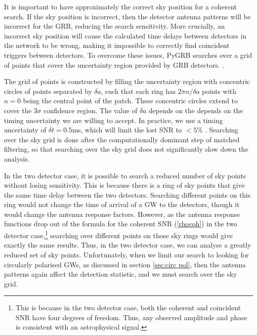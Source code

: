 \documentclass[11pt]{cuthesis}
\begin{document}
It is important to have approximately the correct sky position for a coherent search. If the sky position is incorrect, then the detector antenna patterns will be incorrect for the GRB, reducing the search sensitivity. More crucially, an incorrect sky position will cause the calculated time delays between detectors in the network to be wrong, making it impossible to correctly find coincident triggers between detectors. To overcome these issues, PyGRB searches over a grid of points that cover the uncertainty region provided by GRB detectors. \cite{pygrb_Williamson:2014,was_sky_grid}.

The grid of points is constructed by filling the uncertainty region with concentric circles of points separated by $\delta a$, such that each ring has $2\pi n / \delta a$ points with $n=0$ being the central point of the patch. These concentric circles extend to cover the $3\sigma$ confidence region. The value of $\delta a$ depends on the depends on the timing uncertainty we are willing to accept. In practice, we use a timing uncertainty of $\delta t = 0.5$ms, which will limit the lost SNR to $<5\%$ \cite{pygrb_Williamson:2014}. Searching over the sky grid is done after the computationally dominant step of matched filtering, so that searching over the sky grid does not significantly slow down the analysis.

In the two detector case, it is possible to search a reduced number of sky points without losing sensitivity. This is because there is a ring of sky points that give the same time delay between the two detectors. Searching different points on this ring would not change the time of arrival of a GW to the detectors, though it would change the antenna response factors. However, as the antenna response functions drop out of the formula for the coherent SNR (\ref{rhocoh}) in the two detector case,\footnote{This is because in the two detector case, both the coherent and coincident SNR have four degrees of freedom. Thus, any observed amplitude and phase is consistent with an astrophysical signal.} searching over different points on those sky rings would give exactly the same results. Thus, in the two detector case, we can analyse a greatly reduced set of sky points. Unfortunately, when we limit our search to looking for circularly polarised GWs, as discussed in section \ref{sec:circ pol}, then the antenna patterns again affect the detection statistic, and we must search over the sky grid.
\end{document}
